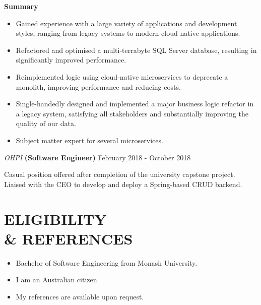 \documentclass[margin, 11pt]{style}
\begin{document}
\begin{resume}
\textbf{Summary}
\begin{itemize}
\item Gained experience with a large variety of applications and development styles, ranging from legacy systems to modern cloud native applications.
\item Refactored and optimised a multi-terrabyte SQL Server database, resulting in significantly improved performance.
\item Reimplemented logic using cloud-native microservices to deprecate a monolith, improving performance and reducing costs.
\item Single-handedly designed and implemented a major business logic refactor in a legacy system, satisfying all stakeholders and substantially improving the quality of our data.
\item Subject matter expert for several microservices.
\end{itemize}

\vspace{15pt}
{\sl OHPI} \textbf{(Software Engineer)} \hfill February 2018 - October 2018

Casual position offered after completion of the university capstone project. Liaised with the CEO to develop and deploy a Spring-based CRUD backend.

\section{ELIGIBILITY \\ \& REFERENCES}

\begin{itemize}
\item Bachelor of Software Engineering from Monash University.
\item I am an Australian citizen.
\item My references are available upon request.
\end{itemize}

\end{resume}
\end{document}
